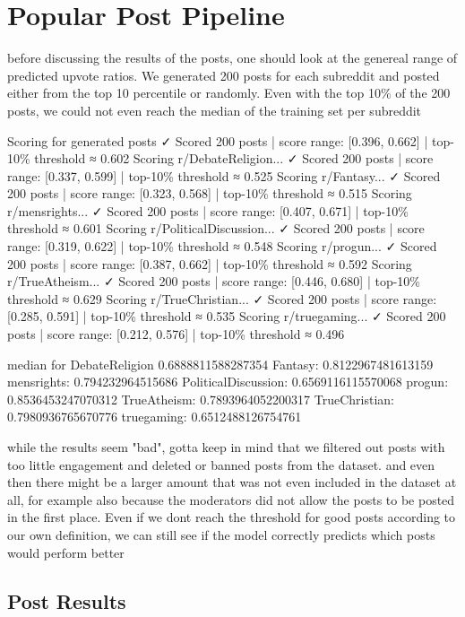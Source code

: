 \section{Popular Post Pipeline}


before discussing the results of the posts, one should look at the genereal range of predicted upvote ratios. We generated 200 posts for each subreddit and posted either from the top 10 percentile or randomly. Even with the top 10\% of the 200 posts, we could not even reach the median of the training set per subreddit

Scoring for generated posts
  ✓ Scored 200 posts | score range: [0.396, 0.662] | top-10\% threshold ≈ 0.602
Scoring r/DebateReligion...
  ✓ Scored 200 posts | score range: [0.337, 0.599] | top-10\% threshold ≈ 0.525
Scoring r/Fantasy...
  ✓ Scored 200 posts | score range: [0.323, 0.568] | top-10\% threshold ≈ 0.515
Scoring r/mensrights...
  ✓ Scored 200 posts | score range: [0.407, 0.671] | top-10\% threshold ≈ 0.601
Scoring r/PoliticalDiscussion...
  ✓ Scored 200 posts | score range: [0.319, 0.622] | top-10\% threshold ≈ 0.548
Scoring r/progun...
  ✓ Scored 200 posts | score range: [0.387, 0.662] | top-10\% threshold ≈ 0.592
Scoring r/TrueAtheism...
  ✓ Scored 200 posts | score range: [0.446, 0.680] | top-10\% threshold ≈ 0.629
Scoring r/TrueChristian...
  ✓ Scored 200 posts | score range: [0.285, 0.591] | top-10\% threshold ≈ 0.535
Scoring r/truegaming...
  ✓ Scored 200 posts | score range: [0.212, 0.576] | top-10\% threshold ≈ 0.496

median for 
DebateReligion 0.6888811588287354
Fantasy: 0.8122967481613159
mensrights: 0.794232964515686
PoliticalDiscussion: 0.6569116115570068
progun: 0.8536453247070312
TrueAtheism: 0.7893964052200317
TrueChristian: 0.7980936765670776
truegaming: 0.6512488126754761

while the results seem "bad", gotta keep in mind that we filtered out posts with too little engagement and deleted or banned posts from the dataset. and even then there might be a larger amount that was not even included in the dataset at all, for example also because the moderators did not allow the posts to be posted in the first place. Even if we dont reach the threshold for good posts according to our own definition, we can still see if the model correctly predicts which posts would perform better


\subsection{Post Results}


